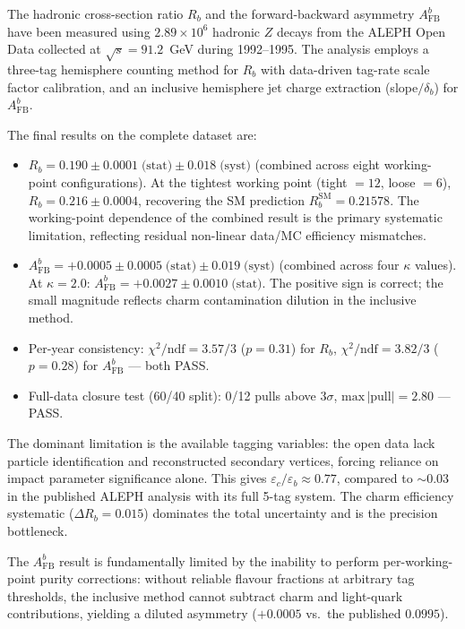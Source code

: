\documentclass[11pt,a4paper]{article}
\begin{document}
The hadronic cross-section ratio $R_b$ and the forward-backward
asymmetry $A_\text{FB}^b$ have been measured using $2.89 \times
10^6$ hadronic $Z$ decays from the ALEPH Open Data collected at
$\sqrt{s} = 91.2$~GeV during 1992--1995.
The analysis employs a three-tag hemisphere counting method for
$R_b$ with data-driven tag-rate scale factor calibration, and an
inclusive hemisphere jet charge extraction (slope$/\delta_b$) for
$A_\text{FB}^b$.

The final results on the complete dataset are:
\begin{itemize}
\item $R_b = 0.190 \pm 0.0001\;\text{(stat)} \pm 0.018\;\text{(syst)}$
  (combined across eight working-point configurations).
  At the tightest working point (tight $= 12$, loose $= 6$),
  $R_b = 0.216 \pm 0.0004$, recovering the SM prediction
  $R_b^\text{SM} = 0.21578$.
  The working-point dependence of the combined result is the
  primary systematic limitation, reflecting residual non-linear
  data/MC efficiency mismatches.
\item $A_\text{FB}^b = +0.0005 \pm 0.0005\;\text{(stat)} \pm
  0.019\;\text{(syst)}$ (combined across four $\kappa$ values).
  At $\kappa = 2.0$:
  $A_\text{FB}^b = +0.0027 \pm 0.0010\;\text{(stat)}$.
  The positive sign is correct; the small magnitude reflects
  charm contamination dilution in the inclusive method.
\item Per-year consistency:
  $\chi^2/\text{ndf} = 3.57/3$ ($p = 0.31$) for $R_b$,
  $\chi^2/\text{ndf} = 3.82/3$ ($p = 0.28$) for $A_\text{FB}^b$
  --- both PASS.
\item Full-data closure test (60/40 split): 0/12 pulls above
  $3\sigma$, $\text{max}\,|\text{pull}| = 2.80$ --- PASS.
\end{itemize}

The dominant limitation is the available tagging variables:
the open data lack particle identification and reconstructed
secondary vertices, forcing reliance on impact parameter
significance alone.
This gives $\varepsilon_c/\varepsilon_b \approx 0.77$, compared
to $\sim$0.03 in the published ALEPH analysis with its full
5-tag system.
The charm efficiency systematic ($\Delta R_b = 0.015$) dominates
the total uncertainty and is the precision bottleneck.

The $A_\text{FB}^b$ result is fundamentally limited by the
inability to perform per-working-point purity corrections:
without reliable flavour fractions at arbitrary tag thresholds,
the inclusive method cannot subtract charm and light-quark
contributions, yielding a diluted asymmetry
($+0.0005$ vs.\ the published $0.0995$).
\end{document}
